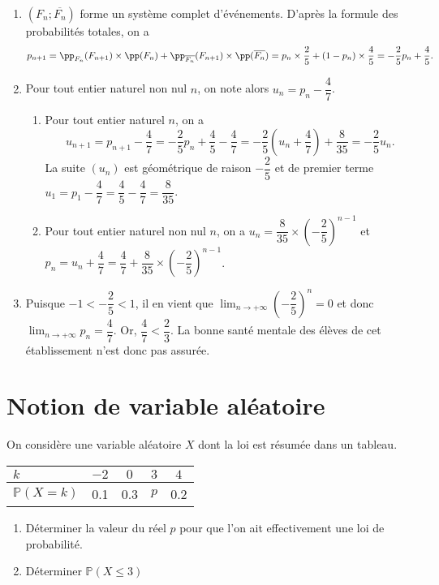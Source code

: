 \documentclass[11pt,fleqn, openany]{book} %
\begin{document}
\begin{solution}
\begin{enumerate}
    \item $(F_n ; \overline{F_n})$ forme un système complet d'événements. D'après la formule des probabilités totales, on a
    \[p_{n+1}=\pp_{F_n}(F_{n+1}) \times \pp(F_n)+\pp_{\overline{F_n}}(F_{n+1}) \times \pp(\overline{F_n})=p_n \times \dfrac{2}{5}+(1-p_n) \times \dfrac{4}{5}=-\dfrac{2}{5}p_n+\dfrac{4}{5}.\]
    \item Pour tout entier naturel non nul $n$, on note alors $u_n=p_n-\dfrac{4}{7}$.
    \begin{enumerate}
        \item Pour tout entier naturel $n$, on a
        \[u_{n+1}=p_{n+1}-\dfrac{4}{7}=-\dfrac{2}{5}p_n+\dfrac{4}{5}-\dfrac{4}{7}=-\dfrac{2}{5}\left(u_n+\dfrac{4}{7}\right)+\dfrac{8}{35}=-\dfrac{2}{5}u_n.\]
        La suite $(u_n)$ est géométrique de raison $-\dfrac{2}{5}$ et de premier terme $u_1=p_1-\dfrac{4}{7}=\dfrac{4}{5}-\dfrac{4}{7}=\dfrac{8}{35}$.
        \item Pour tout entier naturel non nul $n$, on a $u_n = \dfrac{8}{35}\times \left(-\dfrac{2}{5}\right)^{n-1}$ et $p_n=u_n+\dfrac{4}{7}=\dfrac{4}{7}+\dfrac{8}{35} \times \left(-\dfrac{2}{5}\right)^{n-1}$.
    \end{enumerate}
    \item Puisque $-1<-\dfrac{2}{5}<1$, il en vient que $\displaystyle\lim_{n \to +\infty}\left(-\dfrac{2}{5}\right)^n=0$ et donc $\displaystyle\lim_{n \to + \infty}p_n=\dfrac{4}{7}$. Or, $\dfrac{4}{7}<\dfrac{2}{3}$. La bonne santé mentale des élèves de cet établissement n'est donc pas assurée.
\end{enumerate}

\end{solution}




\section*{Notion de variable aléatoire}


\begin{exercise}On considère une variable aléatoire $X$ dont la loi est résumée dans un tableau.

\begin{center}
\begin{tabular}{|l|c|c|c|c|}
\hline
$k$ & $-2$ & $0$ & $3$ & $4$ \\
\hline
$\mathbb{P}(X=k)$ & 0.1 & 0.3 & $p$ & 0.2 \\
\hline \end{tabular}
\end{center}

\begin{enumerate}
\item Déterminer la valeur du réel $p$ pour que l'on ait effectivement une loi de probabilité.
\item Déterminer $\mathbb{P}(X \leqslant 3)$
\end{enumerate}\end{exercise}
\end{document}

